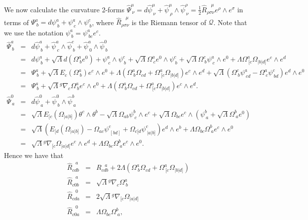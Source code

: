We now calculate the curvature 2-forms $\hat{\Psi}_{\ \nu}^{\mu}={d}\hat{\psi}_{\ \nu}^{\mu}+\hat{\psi}_{\ \rho}^{\mu}\wedge\hat{\psi}_{\ \nu}^{\rho}=\frac{1}{2}\hat{R}_{\rho\sigma\nu}^{\ \ \ \ \mu}e^{\rho}\wedge e^{\sigma}$
in terms of $\Psi_{\ b}^{a}={d}\psi_{\ b}^{a}+\psi_{\ c}^{a}\wedge\psi_{\ b}^{c}$,
where $\hat{R}_{\rho\sigma\nu}^{\ \ \ \ \mu}$ is the Riemann
tensor of $\mathcal{Q}$. Note that we use the notation $\psi_{\ b}^{a}=\psi_{\ bc}^{a}e^{c}$. 
\begin{eqnarray*}
\hat{\Psi}_{\ b}^{a} & = & {d}\hat{\psi}_{\ b}^{a}+\hat{\psi}_{\ c}^{a}\wedge\hat{\psi}_{\ b}^{c}+\hat{\psi}_{\ 0}^{a}\wedge\hat{\psi}_{\ b}^{0}\\
 & = & {d}\psi_{\ b}^{a}+{\sqrt{\Lambda}{d}}(\Omega_{\ b}^{a}e^{0})+\psi_{\ c}^{a}\wedge\psi_{\ b}^{c}+\sqrt{\Lambda}\Omega_{\ c}^{a}e^{0}\wedge\psi_{\ b}^{c}+\sqrt{\Lambda}\Omega_{\ b}^{c}\psi_{\ c}^{a}\wedge e^{0}+\Lambda\Omega_{\ [c}^{a}\Omega_{|b|d]}e^{c}\wedge e^{d}\\
 & = & \Psi_{\ b}^{a}+\sqrt{\Lambda}E_{c}(\Omega_{\ b}^{a})e^{c}\wedge e^{0}+\Lambda(\Omega_{\ b}^{a}\Omega_{cd}+\Omega_{\ [c}^{a}\Omega_{|b|d]})e^{c}\wedge e^{d}+\sqrt{\Lambda}(\Omega_{\ b}^{c}\psi_{\ cd}^{a}-\Omega_{\ c}^{a}\psi_{\ bd}^{c})e^{d}\wedge e^{0}\\
 & = & \Psi_{\ b}^{a}+\sqrt{\Lambda}{^g\nabla}_{c}\Omega_{\ b}^{a}e^{c}\wedge e^{0}+\Lambda(\Omega_{\ b}^{a}\Omega_{cd}+\Omega_{\ [c}^{a}\Omega_{|b|d]})e^{c}\wedge e^{d}.\\
\hat{\Psi}_{\ a}^{0} & = & {d}\hat{\psi}_{\ a}^{0}+\hat{\psi}_{\ b}^{0}\wedge\hat{\psi}_{\ a}^{b}\\
 & = & \sqrt{\Lambda}E_{[c}(\Omega_{|a|b]})\theta^{c}\wedge\theta^{b}-\sqrt{\Lambda}\Omega_{ab}\psi_{\ c}^{b}\wedge e^{c}+\sqrt{\Lambda}\Omega_{bc}e^{c}\wedge(\psi_{\ a}^{b}+\sqrt{\Lambda}\Omega_{\ a}^{b}e^{0})\\
 & = & \sqrt{\Lambda}(E_{[d}(\Omega_{|a|b]})-\Omega_{ac}\psi_{\ [bd]}^{c}+\Omega_{c[d}\psi_{\ |a|b]}^{c})e^{d}\wedge e^{b}+\Lambda\Omega_{bc}\Omega_{\ a}^{b}e^{c}\wedge e^{0}\\
 & = & \sqrt{\Lambda}{^g\nabla}_{[c}\Omega_{|a|d]}e^{c}\wedge e^{d}+\Lambda\Omega_{bc}\Omega_{\ a}^{b}e^{c}\wedge e^{0}.
\end{eqnarray*}
Hence we have that
\begin{eqnarray*}
\hat{R}_{cdb}^{\ \ \ a} & = & R_{cdb}^{\ \ \ a}+2\Lambda(\Omega_{\ b}^{a}\Omega_{cd}+\Omega_{\ [c}^{a}\Omega_{|b|d]})\\
\hat{R}_{c0b}^{\ \ \ a} & = & \sqrt{\Lambda}{^g\nabla}_{c}\Omega_{\ b}^{a}\\
\hat{R}_{cda}^{\ \ \ 0} & = & 2\sqrt{\Lambda}{^g\nabla}_{[c}\Omega_{|a|d]}\\
\hat{R}_{c0a}^{\ \ \ 0} & = & \Lambda\Omega_{bc}\Omega_{\ a}^{b},
\end{eqnarray*}
